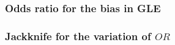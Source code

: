

\subsubsection{Odds ratio for the bias in GLE}



\subsubsection{Jackknife for the variation of $OR$}





